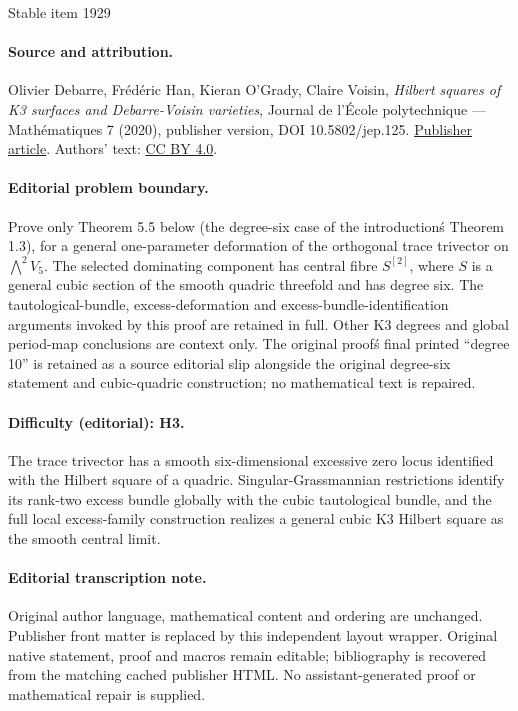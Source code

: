 \documentclass[11pt]{article}
\theoremstyle{definition}
\begin{document}
\begin{center}{\Large Stable item 1929}\end{center}
\paragraph{Source and attribution.}
Olivier Debarre, Frédéric Han, Kieran O’Grady, Claire Voisin, \emph{Hilbert squares of K3 surfaces and Debarre-Voisin varieties}, Journal de l’École polytechnique — Mathématiques 7 (2020), publisher version, DOI 10.5802/jep.125. \href{https://jep.centre-mersenne.org/articles/10.5802/jep.125/}{Publisher article}. Authors' text: \href{https://creativecommons.org/licenses/by/4.0/}{CC BY 4.0}.
\paragraph{Editorial problem boundary.}
Prove only Theorem 5.5 below (the degree-six case of the introduction\'s Theorem 1.3), for a general one-parameter deformation of the orthogonal trace trivector on \(\bigwedge^2 V_5\). The selected dominating component has central fibre \(S^{[2]}\), where \(S\) is a general cubic section of the smooth quadric threefold and has degree six. The tautological-bundle, excess-deformation and excess-bundle-identification arguments invoked by this proof are retained in full. Other K3 degrees and global period-map conclusions are context only. The original proof\'s final printed “degree 10” is retained as a source editorial slip alongside the original degree-six statement and cubic-quadric construction; no mathematical text is repaired.
\paragraph{Difficulty (editorial): H3.}
The trace trivector has a smooth six-dimensional excessive zero locus identified with the Hilbert square of a quadric. Singular-Grassmannian restrictions identify its rank-two excess bundle globally with the cubic tautological bundle, and the full local excess-family construction realizes a general cubic K3 Hilbert square as the smooth central limit.
\paragraph{Editorial transcription note.}
Original author language, mathematical content and ordering are unchanged. Publisher front matter is replaced by this independent layout wrapper. Original native statement, proof and macros remain editable; bibliography is recovered from the matching cached publisher HTML. No assistant-generated proof or mathematical repair is supplied.
\clearpage
\end{document}
